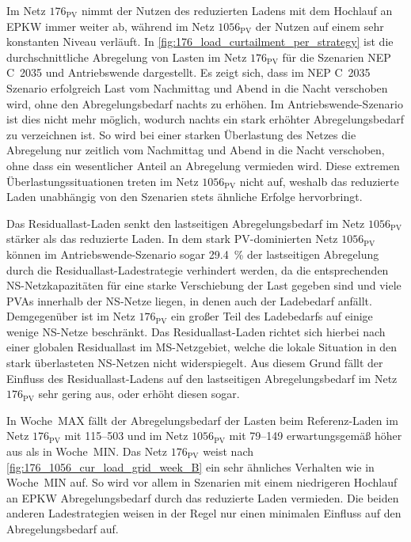 

Im Netz \(176_{\text{PV}}\) nimmt der Nutzen des reduzierten Ladens mit dem Hochlauf an \gls{EPKW} immer weiter ab, während im Netz \(1056_{\text{PV}}\) der Nutzen auf einem sehr konstanten Niveau verläuft.
In \autoref{fig:176_load_curtailment_per_strategy} ist die durchschnittliche Abregelung von Lasten im Netz \(176_{\text{PV}}\) für die Szenarien \gls{NEP} C~\num{2035} und Antriebswende dargestellt.
Es zeigt sich, dass im \gls{NEP} C~\num{2035} Szenario erfolgreich Last vom Nachmittag und Abend in die Nacht verschoben wird, ohne den Abregelungsbedarf nachts zu erhöhen.
Im Antriebswende-Szenario ist dies nicht mehr möglich, wodurch nachts ein stark erhöhter Abregelungsbedarf zu verzeichnen ist.
So wird bei einer starken Überlastung des Netzes die Abregelung nur zeitlich vom Nachmittag und Abend in die Nacht verschoben, ohne dass ein wesentlicher Anteil an Abregelung vermieden wird.
Diese extremen Überlastungssituationen treten im Netz \(1056_{\text{PV}}\) nicht auf, weshalb das reduzierte Laden unabhängig von den Szenarien stets ähnliche Erfolge hervorbringt.\medskip

Das Residuallast-Laden senkt den lastseitigen Abregelungsbedarf im Netz \(1056_{\text{PV}}\) stärker als das reduzierte Laden.
In dem stark \gls{PV}-dominierten Netz \(1056_{\text{PV}}\) können im Antriebswende-Szenario sogar \SI{29.4}{\percent} der lastseitigen Abregelung durch die Residuallast-Ladestrategie verhindert werden, da die entsprechenden \gls{NS}-Netzkapazitäten für eine starke Verschiebung der Last gegeben sind und viele \glspl{PVA} innerhalb der \gls{NS}-Netze liegen, in denen auch der Ladebedarf anfällt.
Demgegenüber ist im Netz \(176_{\text{PV}}\) ein großer Teil des Ladebedarfs auf einige wenige \gls{NS}-Netze beschränkt.
Das Residuallast-Laden richtet sich hierbei nach einer globalen Residuallast im \gls{MS}-Netzgebiet, welche die lokale Situation in den stark überlasteten \gls{NS}-Netzen nicht widerspiegelt.
Aus diesem Grund fällt der Einfluss des Residuallast-Ladens auf den lastseitigen Abregelungsbedarf im Netz \(176_{\text{PV}}\) sehr gering aus, oder erhöht diesen sogar.\medskip

In Woche~MAX fällt der Abregelungsbedarf der Lasten beim Referenz-Laden im Netz \(176_{\text{PV}}\) mit \SIrange{115}{503}{\mwh} und im Netz \(1056_{\text{PV}}\) mit \SIrange{79}{149}{\mwh} erwartungsgemäß höher aus als in Woche~MIN.
Das Netz \(176_{\text{PV}}\) weist nach \autoref{fig:176_1056_cur_load_grid_week_B} ein sehr ähnliches Verhalten wie in Woche~MIN auf.
So wird vor allem in Szenarien mit einem niedrigeren Hochlauf an \gls{EPKW} Abregelungsbedarf durch das reduzierte Laden vermieden.
Die beiden anderen Ladestrategien weisen in der Regel nur einen minimalen Einfluss auf den Abregelungsbedarf auf.

